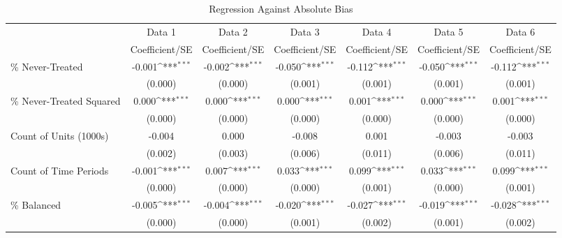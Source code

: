 \begin{table}[htbp]\centering
\def\sym#1{\ifmmode^{#1}\else\(^{#1}\)\fi}
\caption{Regression Against Absolute Bias}
\begin{tabular}{l*{6}{c}}
\hline\hline
                    &\multicolumn{1}{c}{Data 1}&\multicolumn{1}{c}{Data 2}&\multicolumn{1}{c}{Data 3}&\multicolumn{1}{c}{Data 4}&\multicolumn{1}{c}{Data 5}&\multicolumn{1}{c}{Data 6}\\
                    &Coefficient/SE         &Coefficient/SE         &Coefficient/SE         &Coefficient/SE         &Coefficient/SE         &Coefficient/SE         \\
\hline
\% Never-Treated    &      -0.001\sym{***}&      -0.002\sym{***}&      -0.050\sym{***}&      -0.112\sym{***}&      -0.050\sym{***}&      -0.112\sym{***}\\
                    &     (0.000)         &     (0.000)         &     (0.001)         &     (0.001)         &     (0.001)         &     (0.001)         \\
\% Never-Treated Squared&       0.000\sym{***}&       0.000\sym{***}&       0.000\sym{***}&       0.001\sym{***}&       0.000\sym{***}&       0.001\sym{***}\\
                    &     (0.000)         &     (0.000)         &     (0.000)         &     (0.000)         &     (0.000)         &     (0.000)         \\
Count of Units (1000s)&      -0.004         &       0.000         &      -0.008         &       0.001         &      -0.003         &      -0.003         \\
                    &     (0.002)         &     (0.003)         &     (0.006)         &     (0.011)         &     (0.006)         &     (0.011)         \\
Count of Time Periods&      -0.001\sym{***}&       0.007\sym{***}&       0.033\sym{***}&       0.099\sym{***}&       0.033\sym{***}&       0.099\sym{***}\\
                    &     (0.000)         &     (0.000)         &     (0.000)         &     (0.001)         &     (0.000)         &     (0.001)         \\
\% Balanced         &      -0.005\sym{***}&      -0.004\sym{***}&      -0.020\sym{***}&      -0.027\sym{***}&      -0.019\sym{***}&      -0.028\sym{***}\\
                    &     (0.000)         &     (0.000)         &     (0.001)         &     (0.002)         &     (0.001)         &     (0.002)         \\

\end{tabular}
\end{table}
